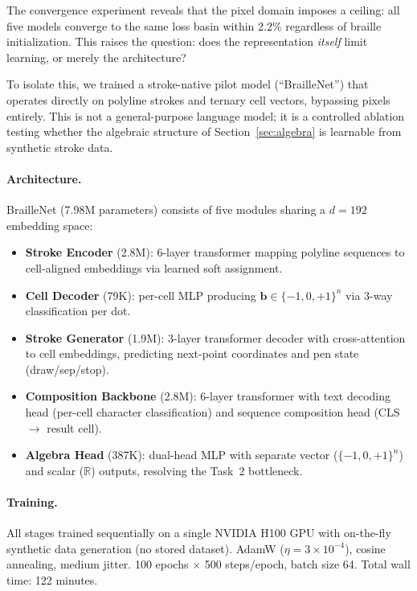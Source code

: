 \documentclass[11pt,a4paper]{article}
\newcommand{\R}{\mathbb{R}}
\newcommand{\bvec}{\bm{b}}
\begin{document}
The convergence experiment reveals that
the pixel domain imposes a ceiling: all five models converge to the
same loss basin within 2.2\% regardless of braille initialization.
This raises the question: does the representation \emph{itself}
limit learning, or merely the architecture?

To isolate this, we trained a stroke-native pilot model
(``BrailleNet'') that operates directly on polyline strokes
and ternary cell vectors, bypassing pixels entirely.
This is not a general-purpose language model; it is a controlled
ablation testing whether the algebraic structure of
Section~\ref{sec:algebra} is learnable from synthetic stroke data.

\paragraph{Architecture.}
BrailleNet (7.98M parameters) consists of five modules sharing a
$d=192$ embedding space:
\begin{itemize}[nosep]
  \item \textbf{Stroke Encoder} (2.8M): 6-layer transformer mapping
    polyline sequences to cell-aligned embeddings via learned
    soft assignment.
  \item \textbf{Cell Decoder} (79K): per-cell MLP producing
    $\bvec \in \{-1, 0, +1\}^n$ via 3-way classification per dot.
  \item \textbf{Stroke Generator} (1.9M): 3-layer transformer decoder
    with cross-attention to cell embeddings, predicting next-point
    coordinates and pen state (draw/sep/stop).
  \item \textbf{Composition Backbone} (2.8M): 6-layer transformer
    with text decoding head (per-cell character classification)
    and sequence composition head (CLS $\rightarrow$ result cell).
  \item \textbf{Algebra Head} (387K): dual-head MLP with separate
    vector ($\{-1,0,+1\}^n$) and scalar ($\R$)
    outputs, resolving the Task~2 bottleneck.
\end{itemize}

\paragraph{Training.}
All stages trained sequentially on a single NVIDIA H100 GPU with
on-the-fly synthetic data generation (no stored dataset).
AdamW ($\eta = 3 \times 10^{-4}$), cosine annealing, medium jitter.
100 epochs $\times$ 500 steps/epoch, batch size 64.
Total wall time: 122 minutes.
\end{document}
